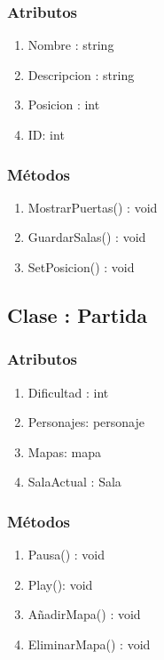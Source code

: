 \subsubsection{Atributos}
\begin{enumerate}
\item Nombre : string
\item Descripcion : string
\item Posicion : int
\item ID: int
\end{enumerate}

\subsubsection{Métodos}
\begin{enumerate}
\item MostrarPuertas() : void
\item GuardarSalas() : void
\item SetPosicion() : void
\end{enumerate}




\subsection{Clase : Partida}\label{sec:uc0}
\subsubsection{Atributos}
\begin{enumerate}
\item Dificultad : int
\item Personajes: personaje
\item Mapas: mapa
\item SalaActual : Sala
\end{enumerate}

\subsubsection{Métodos}
\begin{enumerate}
\item Pausa() : void
\item Play(): void
\item AñadirMapa() : void
\item EliminarMapa() : void
\end{enumerate}